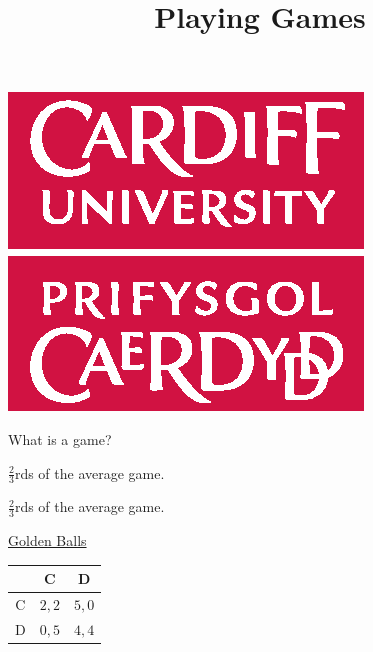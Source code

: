 \documentclass{beamer}
\title{Playing Games}
\date{}
\begin{document}
\begin{frame}
    \maketitle
	\begin{center}
		\includegraphics[width=.3\textwidth]{./img/CUident_CMYK.eps}
	\end{center}
\end{frame}

\begin{frame}
    \begin{center}
        What is a game?
    \end{center}
\end{frame}

\begin{frame}
    \begin{center}
        \(\frac{2}{3}\)rds of the average game.
    \end{center}
\end{frame}

\begin{frame}
\end{frame}

\begin{frame}
    \begin{center}
        \(\frac{2}{3}\)rds of the average game.
    \end{center}
\end{frame}

\begin{frame}
    \begin{center}
        \href{https://www.youtube.com/watch?v=p3Uos2fzIJ0}{Golden Balls}
    \end{center}
\end{frame}

\begin{frame}
    \begin{center}
        \Huge
        \begin{tabular}{|c|c|c|}
            \hline
                   & C        & D        \\
            \hline
            C      & \(2, 2\) & \(5, 0\) \\
            \hline
            D      & \(0, 5\) & \(4, 4\) \\
            \hline
        \end{tabular}
    \end{center}
\end{frame}
\end{document}
